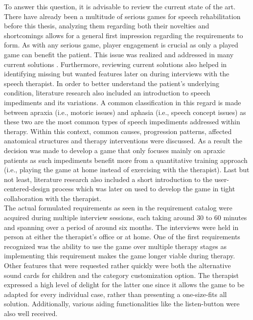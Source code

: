 \documentclass[draft,final]{vutinfth} %
\begin{document}
To answer this question, it is advisable to review the current state of the art. There have already been a multitude of serious games for speech rehabilitation before this thesis, analyzing them regarding both their novelties and shortcomings allows for a general first impression regarding the requirements to form. As with any serious game, player engagement is crucial as only a played game can benefit the patient. This issue was realized and addressed in many current solutions \cite{Phonak, hair2021longitudinal, navarro2014talking}. Furthermore, reviewing current solutions also helped in identifying missing but wanted features later on during interviews with the speech therapist. In order to better understand the patient's underlying condition, literature research also included an introduction to speech impediments and its variations. A common classification in this regard is made between apraxia (i.e., motoric issues) and aphasia (i.e., speech concept issues) as these two are the most common types of speech impediments addressed within therapy. Within this context, common causes, progression patterns, affected anatomical structures and therapy interventions were discussed. As a result the decision was made to develop a game that only focuses mainly on apraxic patients as such impediments benefit more from a quantitative training approach (i.e., playing the game at home instead of exercising with the therapist). Last but not least, literature research also included a short introduction to the user-centered-design process which was later on used to develop the game in tight collaboration with the therapist. \\

The actual formulated requirements as seen in the requirement catalog were acquired during multiple interview sessions, each taking around 30 to 60 minutes and spanning over a period of around six months. The interviews were held in person at either the therapist's office or at home. One of the first requirements recognized was the ability to use the game over multiple therapy stages as implementing this requirement makes the game longer viable during therapy. Other features that were requested rather quickly were both the alternative sound cards for children and the category customization option. The therapist expressed a high level of delight for the latter one since it allows the game to be adapted for every individual case, rather than presenting a one-size-fits all solution. Additionally, various aiding functionalities like the listen-button were also well received. \\
\end{document}
